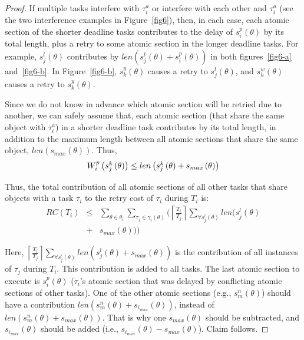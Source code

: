 \documentclass{sig-alternate}
\begin{document}
\begin{proof}
If multiple tasks interfere with $\tau_{i}^a$ or
interfere with each other and $\tau_{i}^a$ (see the two interference examples in Figure~\ref{fig6}), then, in each case, each atomic section of the shorter deadline tasks contributes to the delay of $s_{i}^{p}(\theta)$ by its total length, plus a retry to some atomic section in the longer deadline tasks. For example,
$s_{j}^{l}(\theta)$ contributes by $len(s_{j}^{l}(\theta)+s_{i}^{p}(\theta))$
in both figures~\ref{fig6-a} and~\ref{fig6-b}. 
In Figure~\ref{fig6-b}, $s_{k}^{y}(\theta)$ causes a retry 
to $s_{j}^{l}(\theta)$, and $s_{h}^{w}(\theta)$ causes a retry to $s_{k}^{y}(\theta)$.


Since we do not know in advance which atomic section will be retried
due to another, we can safely assume that, each atomic section (that share the same object with  $\tau_i^a$) in a shorter deadline task contributes by its total length, in addition to the maximum length between all atomic sections that share the same object, $len(s_{max}(\theta))$. Thus, 
\begin{equation}
\mbox{\ensuremath{W_{i}^{p}\left(s_{j}^{k}\left(\theta\right)\right)\le len\left(s_{j}^{k}\left(\theta\right)+s_{max}\left(\theta\right)\right)}}\label{eq2}\end{equation}


Thus, the total contribution of all atomic sections of all other tasks
that share objects with a task $\tau_i$ 
to the retry cost of $\tau_i$ during $T_i$ is:
\begin{eqnarray}
RC\left(T_{i}\right) & \le & \sum_{\theta\in\theta_{i}}\sum_{\tau_{j}\in\gamma_i(\theta)}\Big(\left\lceil\frac{T_{i}}{T_{j}}\right\rceil\sum_{\forall s_{j}^{l}(\theta)}len\big(s_{j}^{l}(\theta)\nonumber \\
 & + & s_{max}(\theta)\big)\Big)\label{eq3-1}\end{eqnarray}



Here, $\left\lceil\frac{T_{i}}{T_{j}}\right\rceil\sum_{\forall s_{j}^{l}\left(\theta\right)}len\left(s_{j}^{l}\left(\theta\right)+s_{max}\left(\theta\right)\right)$ is  the contribution of all instances of $\tau_{j}$ during $T_{i}$. This contribution is added to all tasks. The last atomic section to execute is $s_{i}^{p}(\theta)$ ($\tau_i$'s atomic section that was delayed by conflicting atomic sections of other tasks). One of the other atomic sections (e.g., $s_{m}^{n}(\theta)$) should have a contribution $len(s_{m}^{n}(\theta)+s_{i_{max}}(\theta))$, instead of $len(s_{m}^{n}(\theta)+s_{max}(\theta))$. That is why one $s_{max}(\theta)$ should be subtracted, and $s_{i_{max}}(\theta)$ should be added (i.e., $s_{i_{max}}(\theta)-s_{max}(\theta)$). Claim follows.
\end{proof}
\end{document}
